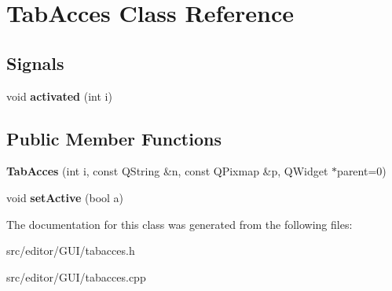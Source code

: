 \hypertarget{class_tab_acces}{\section{\-Tab\-Acces \-Class \-Reference}
\label{class_tab_acces}
}
\subsection*{\-Signals}
\begin{DoxyCompactItemize}
\item 
\hypertarget{class_tab_acces_a3a44992ceb2227664fce84ed26ae226c}{void {\bfseries activated} (int i)}\label{class_tab_acces_a3a44992ceb2227664fce84ed26ae226c}

\end{DoxyCompactItemize}
\subsection*{\-Public \-Member \-Functions}
\begin{DoxyCompactItemize}
\item 
\hypertarget{class_tab_acces_a0e6bcf25a31952e09517ce2273f81786}{{\bfseries \-Tab\-Acces} (int i, const \-Q\-String \&n, const \-Q\-Pixmap \&p, \-Q\-Widget $\ast$parent=0)}\label{class_tab_acces_a0e6bcf25a31952e09517ce2273f81786}

\item 
\hypertarget{class_tab_acces_a2b5298cbcbd0e7e880d7418dea03aa53}{void {\bfseries set\-Active} (bool a)}\label{class_tab_acces_a2b5298cbcbd0e7e880d7418dea03aa53}

\end{DoxyCompactItemize}


\-The documentation for this class was generated from the following files\-:\begin{DoxyCompactItemize}
\item 
src/editor/\-G\-U\-I/tabacces.\-h\item 
src/editor/\-G\-U\-I/tabacces.\-cpp\end{DoxyCompactItemize}
